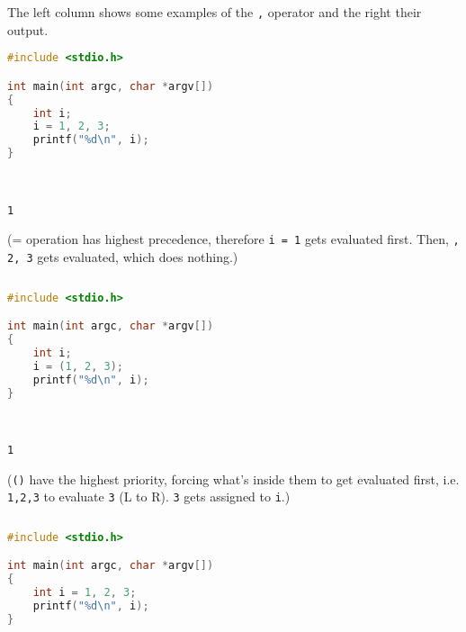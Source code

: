 \documentclass[a4paper]{article}
\begin{document}
\begin{exmp}
The left column shows some examples of the \texttt{,} operator and the right their output. 
\begin{multicols}{2}

\begin{lstlisting}[language=c]
#include <stdio.h>

int main(int argc, char *argv[])
{
	int i;
	i = 1, 2, 3;	
	printf("%d\n", i);
}
\end{lstlisting}

\columnbreak 
\; \\
\begin{verbatim}
1
\end{verbatim}

(= operation has highest precedence, therefore \texttt{i = 1} gets evaluated first. Then, \texttt{, 2, 3} gets evaluated, which does nothing.)
\begin{verbatim}
\end{verbatim}
\end{multicols}

\begin{multicols}{2}

\begin{lstlisting}[language=c]
#include <stdio.h>

int main(int argc, char *argv[])
{
	int i;
	i = (1, 2, 3);	
	printf("%d\n", i);
}
\end{lstlisting}

\columnbreak
\; \\
\begin{verbatim}
1
\end{verbatim}

(\texttt{()} have the highest priority, forcing what's inside them to get evaluated first, i.e. \texttt{1,2,3} to evaluate \texttt{3} (L to R). \texttt{3} gets assigned to \texttt{i}.)
\begin{verbatim}
\end{verbatim}
\end{multicols}

\begin{multicols}{2}

\begin{lstlisting}[language=c]
#include <stdio.h>

int main(int argc, char *argv[])
{
	int i = 1, 2, 3;	
	printf("%d\n", i);
}
\end{lstlisting}


\end{multicols}
\end{exmp}
\end{document}
